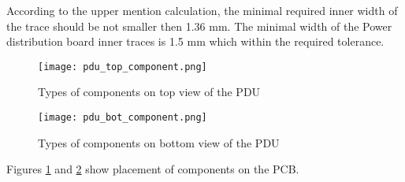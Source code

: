 According to the upper mention calculation, the minimal required inner width of the trace should be not smaller then 1.36 mm. The minimal width of the Power distribution board inner traces is 1.5 mm which within the required tolerance. 



\begin{figure}[h]
	\centering
	\texttt{[image: pdu\_top\_component.png]}
	\caption{Types of components on  top view of the PDU }
	\label{fig: pdu_comp_top}
\end{figure} 

\begin{figure}[h]
	\centering
	\texttt{[image: pdu\_bot\_component.png]}
	\caption{Types of components on  bottom view of the PDU}
	\label{fig: pdu_comp_bot}
\end{figure} 


Figures \ref{fig: pdu_comp_top} and \ref{fig: pdu_comp_bot} show placement of components on the PCB.
 


